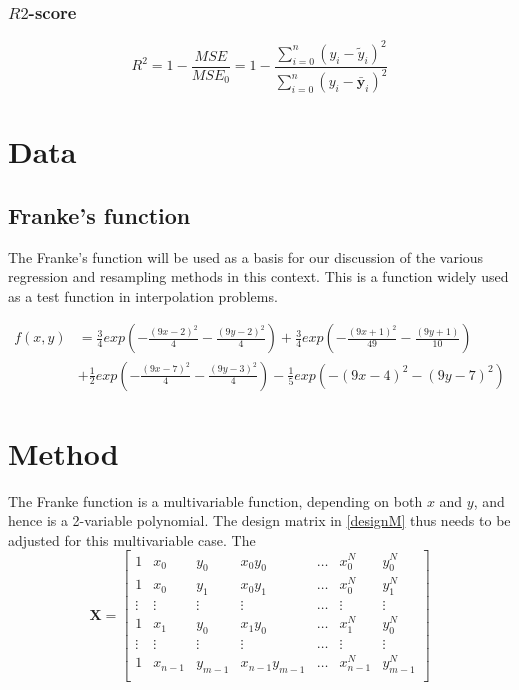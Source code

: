 \documentclass{article}
\begin{document}
\subsubsection{$R2$-score}
\begin{equation}
R^{2} = 1-\frac{MSE}{MSE_{0}} = 1-\frac{\sum_{i=0}^{n}(y_{i} - \tilde{y}_{i})^{2}}{\sum_{i=0}^{n}(y_{i} - \bar{\textbf{y}}_{i})^{2}}
\end{equation}

\section{Data}
\subsection{Franke's function}
The Franke's function will be used as a basis for our discussion of the various regression and resampling methods in this context. This is a function  widely used as a test function in interpolation problems.

\begin{align*}
f(x,y) &= \frac{3}{4}exp\left(-\frac{(9x-2)^2}{4} - \frac{(9y-2)^2}{4}\right)+\frac{3}{4}exp\left(-\frac{(9x+1)^2}{49} - \frac{(9y+1)}{10}\right)\\
&+ \frac{1}{2}exp\left(-\frac{(9x-7)^2}{4} - \frac{(9y-3)^2}{4}\right)-\frac{1}{5}exp\left(-(9x-4)^2 - (9y-7)^2\right)
\end{align*}
\section{Method}
The Franke function is a multivariable function, depending on both $x$ and $y$, and hence is a 2-variable polynomial. The design matrix in \ref{designM} thus needs to be adjusted for this multivariable case. The 
$$\textbf{X} = \begin{bmatrix}
1 & x_{0} & y_{0} & x_{0}y_{0} & \dots & x_{0}^{N} & y_{0}^{N}     \\
1 & x_{0} & y_{1} & x_{0}y_{1} & \dots & x_{0}^{N} & y_{1}^{N}  \\
\vdots & \vdots & \vdots & \vdots & \dots & \vdots & \vdots \\
1 & x_{1} & y_{0} & x_{1}y_{0} & \dots & x_{1}^{N} & y_{0}^{N} \\
\vdots & \vdots & \vdots & \vdots & \dots & \vdots & \vdots \\
1 & x_{n-1} & y_{m-1} & x_{n-1}y_{m-1} & \dots & x_{n-1}^{N} & y_{m-1}^{N} \\
\end{bmatrix}$$
\end{document}
